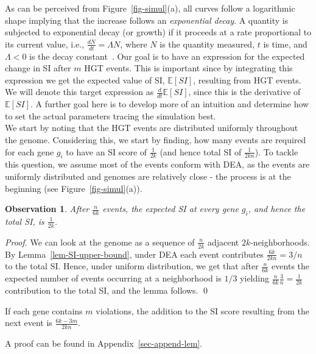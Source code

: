 \documentclass[runningheads, 11pt]{llncs}
\newtheorem{observation}[thm]{Observation}
\newcommand{\EE}{\mathbb{E}}
\begin{document}
As can be perceived from Figure~\ref{fig-simul}(a), all curves follow a
logarithmic shape implying that the increase follows an \emph{ exponential
decay}. A quantity is subjected to exponential decay (or growth) if it proceeds
at a rate proportional to its current value, i.e., $\frac{dN}{dt}=\Lambda N$,
where $N$ is the quantity measured, $t$ is time, and $\Lambda < 0$ is the decay
constant~\cite{durrett2008probability}. Our goal is to have an expression for
the expected change in SI after $m$ HGT events. This is important since by
integrating this expression we get the expected value of SI, $\EE[SI]$,
resulting from HGT events. We will denote this target expression as $\frac
{d}{dt}\EE[SI]$, since this is the derivative of $\EE[SI]$. A further goal here
is to develop more of an intuition and determine how to set the actual
parameters tracing the simulation best.\\ We start by noting that the HGT events
are distributed uniformly throughout the genome. Considering this, we start by
finding, how many events are required for each gene $g_i$ to have an SI score of
$\frac 1{2k}$ (and hence total SI of $\frac 1{2kn}$). To tackle this question,
we assume most of the events conform with DEA, as the events are uniformly
distributed and genomes are relatively close - the process is at the beginning
(see Figure~\ref{fig-simul}(a)).

\begin{observation}
After $\frac n{6k}$ events, the expected SI at every gene $g_i$, and hence the
total SI, is $\frac 1{2k}$.
\end{observation}
\begin{proof}
We can look at the genome as a sequence of $\frac n{2k}$ adjacent
$2k$-neighborhoods. By Lemma~\ref{lem-SI-upper-bound}, under DEA each event
contributes $\frac{ 6k}{2kn}=3/n$ to the total SI. Hence, under uniform
distribution, we get that after $\frac n{6k}$ events the expected number of
events occurring at a neighborhood is $1/3$ yielding $\frac n{6k}\frac 3n =
\frac1{2k}$ contribution to the total SI, and the lemma follows. \qed

\end{proof}
\begin{lemma}\label{lem:dea}
If each gene contains $m$ violations, the addition to the SI score resulting
from the next event is $\frac{6k-3m}{2kn}$.
\end{lemma}
A proof can be found in Appendix~\ref{sec-append-lem}.
\end{document}
